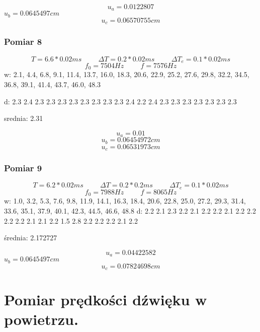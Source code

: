 \documentclass[12pt,a4paper]{article}
\begin{document}
$$
u_a = 0.0122807
$$
$u_b = 0.0645497cm $
$$u_c = 0.06570755cm $$
\subsubsection{Pomiar 8}
$$
T = 6.6*0.02ms \hspace{1cm} \Delta T = 0.2*0.02ms \hspace{1cm} \Delta T_e = 0.1*0.02ms 
$$
$$
f_0 = 7504 Hz \hspace{1cm} f=7576Hz
$$
w: 2.1, 4.4, 6.8, 9.1, 11.4, 13.7, 16.0, 18.3, 20.6, 22.9, 25.2, 27.6, 29.8, 32.2, 34.5, 36.8, 39.1, 41.4, 43.7, 46.0, 48.3

d: 2.3 2.4 2.3 2.3 2.3 2.3 2.3 2.3 2.3 2.3 2.4 2.2 2.4 2.3 2.3 2.3 2.3 2.3 2.3 2.3

srednia: 2.31

$$
u_a = 0.01
$$
$$u_b = 0.06454972cm $$
$$u_c = 0.06531973cm $$
\subsubsection{Pomiar 9}
$$
T = 6.2*0.02ms \hspace{1cm} \Delta T = 0.2*0.2ms \hspace{1cm} \Delta T_e = 0.1*0.02ms 
$$
$$
f_0 = 7988Hz \hspace{1cm} f=8065Hz
$$
w: 1.0, 3.2, 5.3, 7.6, 9.8, 11.9, 14.1, 16.3, 18.4, 20.6, 22.8, 25.0, 27.2, 29.3, 31.4, 33.6, 35.1, 37.9, 40.1, 42.3, 44.5, 46.6, 48.8
d: 2.2 2.1 2.3 2.2 2.1 2.2 2.2 2.1 2.2 2.2 2.2 2.2 2.1 2.1 2.2 1.5 2.8 2.2 2.2 2.2 2.1 2.2


średnia: 2.172727

$$
u_a = 0.04422582
$$
$u_b = 0.0645497cm $
$$u_c = 0.07824698cm $$

\section{Pomiar prędkości dźwięku w powietrzu.}
\end{document}
